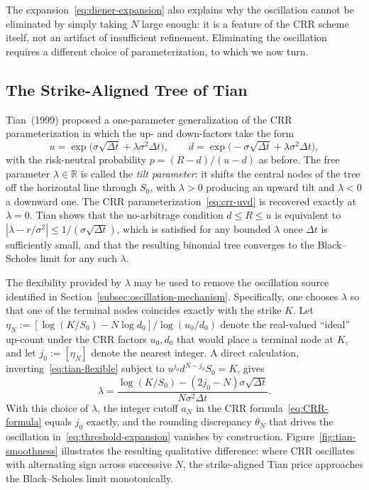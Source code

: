 \documentclass[11pt,a4paper]{article}
\theoremstyle{plain}
\theoremstyle{definition}
\newcommand{\R}{\mathbb{R}}
\begin{document}
The expansion~\eqref{eq:diener-expansion} also explains why the
oscillation cannot be eliminated by simply taking $N$ large enough: it
is a feature of the CRR scheme itself, not an artifact of insufficient
refinement. Eliminating the oscillation requires a different choice of
parameterization, to which we now turn.

\subsection{The Strike-Aligned Tree of Tian}
\label{subsec:tian}

Tian~(1999) proposed a one-parameter generalization of the CRR
parameterization in which the up- and down-factors take the form
\begin{equation}
    \label{eq:tian-flexible}
    u = \exp\!\bigl(\sigma\sqrt{\Delta t} + \lambda\sigma^2 \Delta t\bigr),
    \qquad
    d = \exp\!\bigl(-\sigma\sqrt{\Delta t} + \lambda\sigma^2 \Delta t\bigr),
\end{equation}
with the risk-neutral probability $p = (R - d)/(u - d)$ as before. The
free parameter $\lambda \in \R$ is called the \emph{tilt parameter}: it
shifts the central nodes of the tree off the horizontal line through
$S_0$, with $\lambda > 0$ producing an upward tilt and $\lambda < 0$ a
downward one. The CRR parameterization~\eqref{eq:crr-uvd} is recovered
exactly at $\lambda = 0$. Tian shows that the no-arbitrage condition
$d \leq R \leq u$ is equivalent to
$|\lambda - r/\sigma^2| \leq 1/(\sigma\sqrt{\Delta t})$, which is
satisfied for any bounded $\lambda$ once $\Delta t$ is sufficiently
small, and that the resulting binomial tree converges to the
Black--Scholes limit for any such $\lambda$.

The flexibility provided by $\lambda$ may be used to remove the
oscillation source identified in
Section~\ref{subsec:oscillation-mechanism}. Specifically, one chooses
$\lambda$ so that one of the terminal nodes coincides exactly with the
strike $K$. Let $\eta_N := [\log(K/S_0) - N \log d_0]/\log(u_0/d_0)$
denote the real-valued ``ideal'' up-count under the CRR factors
$u_0, d_0$ that would place a terminal node at $K$, and let
$j_0 := [\eta_N]$ denote the nearest integer. A direct calculation,
inverting~\eqref{eq:tian-flexible} subject to
$u^{j_0} d^{N - j_0} S_0 = K$, gives
\begin{equation}
    \label{eq:tian-lambda}
    \lambda = \frac{\log(K/S_0) - (2 j_0 - N)\sigma\sqrt{\Delta t}}
                   {N \sigma^2 \Delta t}.
\end{equation}
With this choice of $\lambda$, the integer cutoff $a_N$ in the CRR
formula~\eqref{eq:CRR-formula} equals $j_0$ exactly, and the rounding
discrepancy $\theta_N$ that drives the oscillation
in~\eqref{eq:threshold-expansion} vanishes by construction.
Figure~\ref{fig:tian-smoothness} illustrates the resulting
qualitative difference: where CRR oscillates with alternating sign
across successive $N$, the strike-aligned Tian price approaches the
Black--Scholes limit monotonically.
\end{document}
